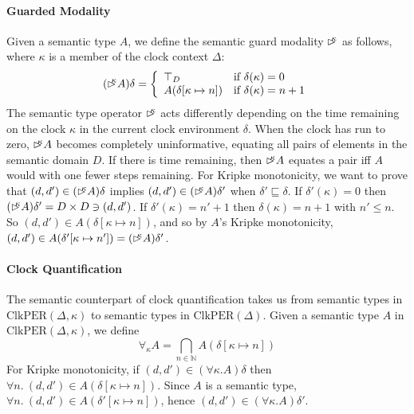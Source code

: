 \documentclass[natbib]{sigplanconf}
\newcommand{\delay}[1]{\mathord{\rhd\kern-0.4em^{#1}}}
\newcommand{\ClkPER}{\mathrm{ClkPER}}
\begin{document}
\paragraph{Guarded Modality} Given a semantic type $A$, we define the
semantic guard modality $\delay\kappa$ as follows, where $\kappa$ is a
member of the clock context $\Delta$:
\begin{displaymath}
  (\delay\kappa A)\delta = \left\{
    \begin{array}{ll}
      \top_D & \textrm{if }\delta(\kappa) = 0 \\
      A(\delta[\kappa \mapsto n]) & \textrm{if }\delta(\kappa) = n + 1
    \end{array}
  \right.
\end{displaymath}
The semantic type operator $\delay\kappa$ acts differently
depending on the time remaining on the clock $\kappa$ in the current
clock environment $\delta$. When the clock has run to zero,
$\delay\kappa A$ becomes completely uninformative, equating all pairs
of elements in the semantic domain $D$. If there is time remaining,
then $\delay\kappa A$ equates a pair iff $A$ would with one fewer
steps remaining. For Kripke monotonicity, we want to prove that
$(d,d') \in (\delay\kappa A)\delta$ implies $(d,d') \in (\delay\kappa
A)\delta'$ when $\delta' \sqsubseteq \delta$. If $\delta'(\kappa) = 0$
then $(\delay\kappa A)\delta' = D \times D \ni (d,d')$. If
$\delta'(\kappa) = n' + 1$ then $\delta(\kappa) = n + 1$ with $n' \leq
n$. So $(d,d') \in A(\delta[\kappa \mapsto n])$, and so by $A$'s Kripke
monotonicity, $(d,d') \in A(\delta'[\kappa \mapsto n']) =
(\delay\kappa A)\delta'$.

\paragraph{Clock Quantification}
The semantic counterpart of clock quantification takes us from
semantic types in $\ClkPER(\Delta, \kappa)$ to semantic types in
$\ClkPER(\Delta)$. Given a semantic type $A$ in $\ClkPER(\Delta,
\kappa)$, we define
\begin{displaymath}
  \forall_\kappa A = \bigcap_{n \in \mathbb{N}} A(\delta[\kappa \mapsto n])
\end{displaymath}
For Kripke monotonicity, if $(d,d') \in (\forall\kappa. A)\delta$ then
$\forall n.\ (d,d') \in A(\delta[\kappa \mapsto n])$. Since $A$ is a
semantic type, $\forall n.\ (d,d') \in A(\delta'[\kappa \mapsto n])$,
hence $(d,d') \in (\forall\kappa. A)\delta'$.
\end{document}
